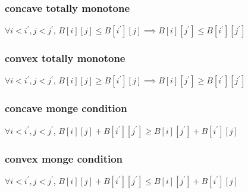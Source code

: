 \subsubsection{concave totally monotone}
$\forall i < i^\prime, j < j^\prime$, $B[i][j] \leq B[i^\prime][j] \implies B[i][j^\prime] \leq B[i^\prime][j^\prime]$
\subsubsection{convex totally monotone}
$\forall i < i^\prime, j < j^\prime$, $B[i][j] \geq B[i^\prime][j] \implies B[i][j^\prime] \geq B[i^\prime][j^\prime]$
\subsubsection{concave monge condition}
$\forall i < i^\prime, j < j^\prime$, $B[i][j] + B[i^\prime][j^\prime] \geq B[i][j^\prime] + B[i^\prime][j]$
\subsubsection{convex monge condition}
$\forall i < i^\prime, j < j^\prime$, $B[i][j] + B[i^\prime][j^\prime] \leq B[i][j^\prime] + B[i^\prime][j]$
